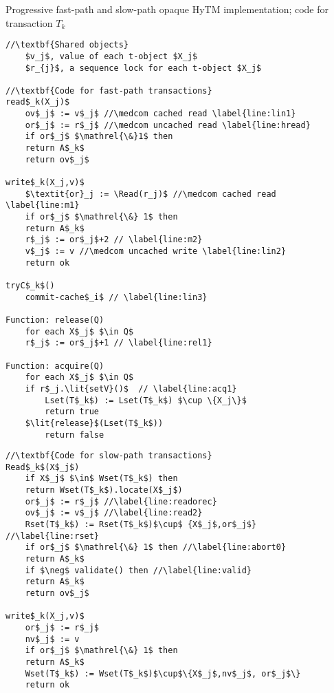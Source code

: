 \begin{algorithm*}[!ht]
\caption{Progressive fast-path and slow-path opaque HyTM implementation; code for transaction $T_k$}
\label{alg:inswrite}
\vspace{-1mm}
\noindent\lstset{style=customc}
\begin{minipage}{0.49\textwidth}
\begin{lstlisting}[frame=none,firstnumber=1,mathescape=true]
//\textbf{Shared objects}
    $v_j$, value of each t-object $X_j$ 
    $r_{j}$, a sequence lock for each t-object $X_j$

//\textbf{Code for fast-path transactions}
read$_k(X_j)$
    ov$_j$ := v$_j$ //\medcom cached read \label{line:lin1}
    or$_j$ := r$_j$ //\medcom uncached read \label{line:hread}
    if or$_j$ $\mathrel{\&}1$ then  
	return A$_k$ 
    return ov$_j$ 

write$_k(X_j,v)$
    $\textit{or}_j := \Read(r_j)$ //\medcom cached read \label{line:m1}
    if or$_j$ $\mathrel{\&} 1$ then  		
	return A$_k$ 
    r$_j$ := or$_j$+2 // \label{line:m2}
    v$_j$ := v //\medcom uncached write \label{line:lin2} 
    return ok

tryC$_k$()
    commit-cache$_i$ // \label{line:lin3}

Function: release(Q)
    for each X$_j$ $\in Q$
	r$_j$ := or$_j$+1 // \label{line:rel1}	
	
Function: acquire(Q)
    for each X$_j$ $\in Q$	
	if r$_j.\lit{setV}()$  // \label{line:acq1}
	    Lset(T$_k$) := Lset(T$_k$) $\cup \{X_j\}$
	    return true
	$\lit{release}$(Lset(T$_k$))
	    return false
\end{lstlisting}
\end{minipage}
\begin{minipage}{0.49\textwidth}
\begin{lstlisting}[frame=none,firstnumber=last,mathescape=true]
//\textbf{Code for slow-path transactions}
Read$_k$(X$_j$)
    if X$_j$ $\in$ Wset(T$_k$) then
	return Wset(T$_k$).locate(X$_j$) 
    or$_j$ := r$_j$ //\label{line:readorec}
    ov$_j$ := v$_j$ //\label{line:read2}
    Rset(T$_k$) := Rset(T$_k$)$\cup$ {X$_j$,or$_j$} //\label{line:rset}
    if or$_j$ $\mathrel{\&} 1$ then //\label{line:abort0}	
	return A$_k$
    if $\neg$ validate() then //\label{line:valid}
	return A$_k$
    return ov$_j$

write$_k(X_j,v)$
    or$_j$ := r$_j$
    nv$_j$ := v
    if or$_j$ $\mathrel{\&} 1$ then	
	return A$_k$ 
    Wset(T$_k$) := Wset(T$_k$)$\cup$\{X$_j$,nv$_j$, or$_j$\}
    return ok


\end{lstlisting}
\end{minipage}
\end{algorithm*}

